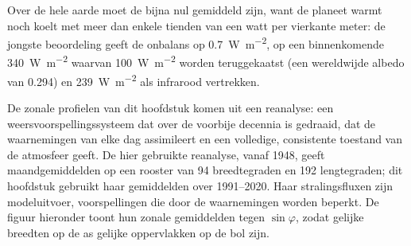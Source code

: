 Over de hele aarde moet de  bijna nul gemiddeld zijn, want de planeet warmt noch koelt met meer dan enkele tienden van een watt per vierkante meter: de jongste beoordeling geeft de onbalans op \qty{0.7}{W.m^{-2}}, op een binnenkomende \qty{340}{W.m^{-2}} waarvan \qty{100}{W.m^{-2}} worden teruggekaatst (een wereldwijde albedo van \num{0.294}) en \qty{239}{W.m^{-2}} als infrarood vertrekken.

De zonale profielen van dit hoofdstuk komen uit een reanalyse: een weersvoorspellingssysteem dat over de voorbije decennia is gedraaid, dat de waarnemingen van elke dag assimileert en een volledige, consistente toestand van de atmosfeer geeft. De hier gebruikte reanalyse, vanaf 1948, geeft maandgemiddelden op een rooster van 94 breedtegraden en 192 lengtegraden; dit hoofdstuk gebruikt haar gemiddelden over 1991--2020. Haar stralingsfluxen zijn modeluitvoer, voorspellingen die door de waarnemingen worden beperkt. De figuur hieronder toont hun zonale gemiddelden tegen $\sin\varphi$, zodat gelijke breedten op de as gelijke oppervlakken op de bol zijn.

